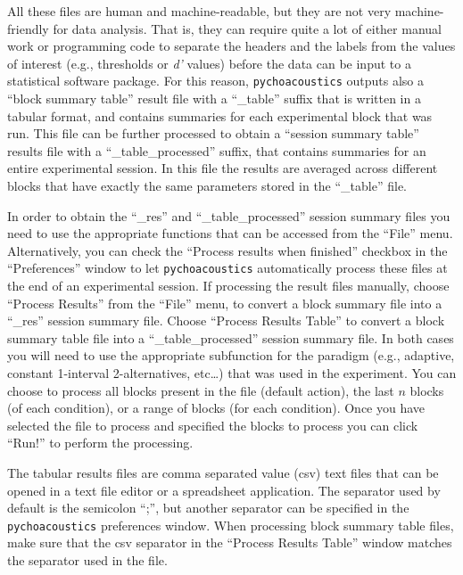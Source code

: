 All these files are human and machine-readable, but they are not very machine-friendly 
for data analysis. That is, they can require quite a lot of either manual 
work or programming code to separate the headers and the labels from the 
values of interest (e.g., thresholds or \emph{d'} values) before the data can be 
input to a statistical software package. For this reason, \texttt{pychoacoustics} 
outputs also a ``block summary table'' result file with a ``\_table'' 
suffix that is written in a tabular format, and contains summaries for 
each experimental block that was run. This file can be further processed 
to obtain a ``session summary table'' results file with a ``\_table\_processed'' 
suffix, that contains summaries for an entire experimental session. In this file 
the results are averaged across different blocks that have exactly the same 
parameters stored in the ``\_table'' file.

In order to obtain the ``\_res'' and ``\_table\_processed'' session summary files you need to use the 
appropriate functions that can be accessed from the ``File'' menu. Alternatively, you can check the 
``Process results when finished'' checkbox in the ``Preferences'' window to let \texttt{pychoacoustics} 
automatically process these files at the end of an experimental session. If processing the result files 
manually, choose ``Process Results'' from the ``File'' menu, to convert a block summary file into 
a ``\_res'' session summary file. Choose ``Process Results Table'' to convert a block summary table 
file into a ``\_table\_processed'' session summary file. In both cases you will need to use the appropriate 
subfunction for the paradigm (e.g., adaptive, constant 1-interval 2-alternatives, etc\ldots) that was 
used in the experiment. You can choose to process all blocks present in the file (default action), the 
last $n$ blocks (of each condition), or a range of blocks (for each condition). Once you have selected 
the file to process and specified the blocks to process you can click ``Run!'' to perform the processing.

The tabular results files are comma separated value (csv) text files that can be opened in a text file 
editor or a spreadsheet application. The separator used by default is the semicolon ``;'', 
but another separator can be specified in the \texttt{pychoacoustics} preferences window. 
When processing block summary table files, make sure that the csv separator in the 
``Process Results Table'' window matches the separator used in the file.

